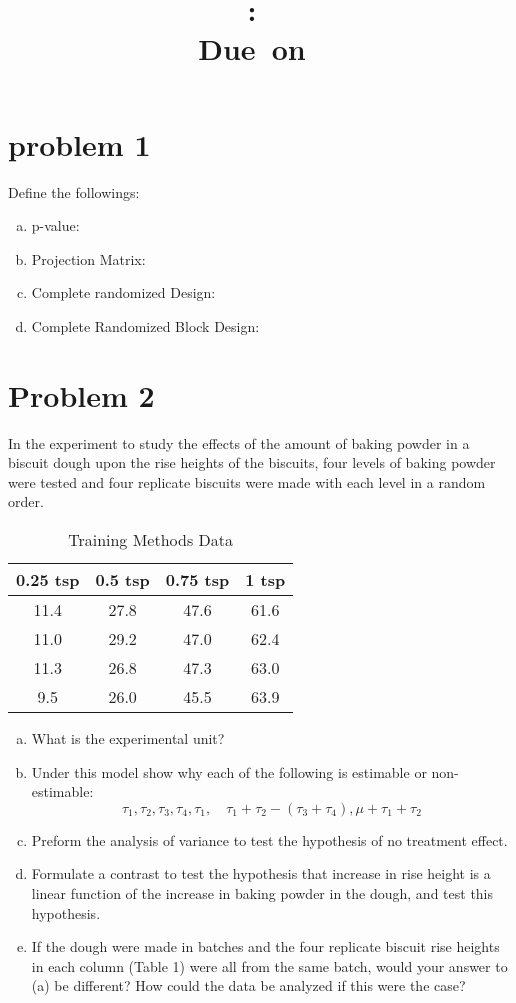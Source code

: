 \documentclass{article}
\title{
	\vspace{2in}
	\textmd{\textbf{\hmwkClass:\ \hmwkTitle}}\\
	\normalsize\vspace{0.1in}\small{Due\ on\ \hmwkDueDate}\\
	\vspace{0.1in}\large{\textit{\hmwkClassInstructor}}
	\vspace{3in}
}
\author{\hmwkAuthorName}
\date{}
\begin{document}
\maketitle
\pagebreak
\tableofcontents
\pagebreak

\section{problem 1}
Define the followings:
\begin{enumerate}[(a)]
	\item p-value:
	\item Projection Matrix:
	\item Complete randomized Design:
	\item Complete Randomized Block Design:
\end{enumerate}

\section{Problem 2}
In the experiment to study the effects of the amount of baking powder in a biscuit dough upon the rise heights of the biscuits, four
levels of baking powder were tested and four replicate biscuits  were made with each level in a random order.
\begin{table}[!ht]
	\centering
	\caption{Training Methods Data}
	\begin{tabular}{c c c c}
		\hline
		\textbf{0.25 tsp} & \textbf{0.5 tsp} & \textbf{0.75 tsp} & \textbf{1 tsp} \\
		\hline
		11.4              & 27.8             & 47.6              & 61.6           \\
		11.0              & 29.2             & 47.0              & 62.4           \\
		11.3              & 26.8             & 47.3              & 63.0           \\
		9.5               & 26.0             & 45.5              & 63.9           \\
		\hline
	\end{tabular}
\end{table}
\begin{enumerate}[(a)]
	\item What is the experimental unit?
	\item Under this model  show why each of the following is estimable or non-estimable:
	      $$
		      \tau_1, \tau_2, \tau_3,\tau_4,\tau_1, \quad \tau_1 + \tau_2 - (\tau_3 + \tau_4), \mu + \tau_1 + \tau_2
	      $$
	\item Preform the analysis of variance to test the hypothesis of no treatment effect.
	\item Formulate a contrast to test the hypothesis that increase in rise height is a linear function of the increase in baking powder in the dough,
	      and test this hypothesis.
	\item If the dough were made in batches and the four replicate biscuit rise heights in each column (Table 1) were all from the same batch, would your answer to (a) be different?
	      How could the data be analyzed if this were the case?
\end{enumerate}
\end{document}
